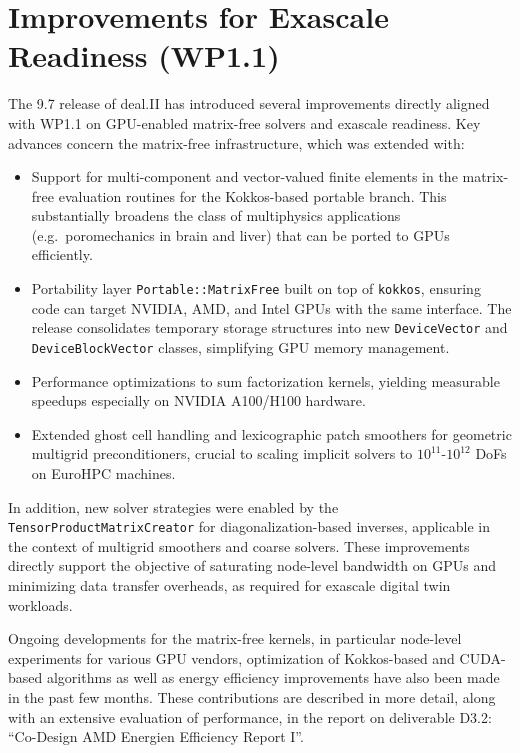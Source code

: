 \documentclass[a4paper,12pt]{article}
\begin{document}
\section{Improvements for Exascale Readiness (WP1.1)}
\label{sec:section2}

The 9.7 release of deal.II has introduced several improvements directly aligned
with WP1.1 on GPU-enabled matrix-free solvers and exascale readiness.  
Key advances concern the matrix-free infrastructure, which was extended with:


\begin{itemize}
  \item Support for multi-component and vector-valued finite elements in the
        matrix-free evaluation routines for the Kokkos-based portable branch. This substantially broadens the class
        of multiphysics applications (e.g.\ poromechanics in brain and liver)
        that can be ported to GPUs efficiently.
  \item Portability layer \texttt{Portable::MatrixFree} built on top of
        \texttt{kokkos}, ensuring code can target NVIDIA, AMD, and Intel GPUs with the
        same interface. The release consolidates temporary storage structures
        into new \texttt{DeviceVector} and \texttt{DeviceBlockVector} classes,
        simplifying GPU memory management.
  \item Performance optimizations to sum factorization kernels, yielding
        measurable speedups especially on NVIDIA A100/H100 hardware.
  \item Extended ghost cell handling and lexicographic patch smoothers for
        geometric multigrid preconditioners, crucial to scaling implicit solvers
        to $10^{11}$-$10^{12}$ DoFs on EuroHPC machines.
\end{itemize}

In addition, new solver strategies were enabled by the\\
\texttt{TensorProductMatrixCreator} for diagonalization-based inverses,
applicable in the context of multigrid smoothers and coarse solvers.
These improvements directly support the objective of saturating node-level
bandwidth on GPUs and minimizing data transfer overheads, as required for
exascale digital twin workloads.

Ongoing developments for the matrix-free kernels, in particular node-level
experiments for various GPU vendors, optimization of Kokkos-based and
CUDA-based algorithms as well as energy efficiency improvements have also been
made in the past few months. These contributions are described in more detail,
along with an extensive evaluation of performance, in the report on
deliverable D3.2: ``Co-Design AMD Energien Efficiency Report I''.
\end{document}

